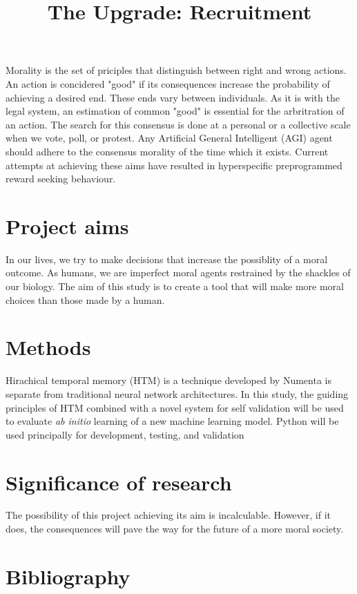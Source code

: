 \documentclass[12pt]{article}
\title{The Upgrade: Recruitment}
\date{\vspace{-5ex}}
\author{\vspace{-5ex}}
\begin{document}
\maketitle

Morality is the set of priciples that distinguish between right and wrong actions. An action is concidered "good" if its consequences increase the probability of achieving a desired end. These ends vary between individuals. As it is with the legal system, an estimation of common "good" is essential for the arbritration of an action. The search for this consensus is done at a personal or a collective scale when we vote, poll, or protest.  Any Artificial General Intelligent (AGI) agent should adhere to the consensus morality of the time which it exists. Current attempts at achieving these aims have resulted in hyperspecific preprogrammed reward seeking behaviour.

\section*{Project aims}
In our lives, we try to make decisions that increase the possiblity of a moral outcome. As humans, we are imperfect moral agents restrained by the shackles of our biology. The aim of this study is to create a tool that will make more moral choices than those made by a human. 

\section*{Methods}
Hirachical temporal memory (HTM) is a technique developed by Numenta \cite{numentahome} is separate from traditional neural network architectures.  In this study, the guiding principles of HTM combined with a novel system for self validation will be used to evaluate \emph{ab initio} learning of a new machine learning model. Python will be used principally for development, testing, and validation

\section*{Significance of research}
The possibility of this project achieving its aim is incalculable. However, if it does, the consequences will pave the way for the future of a more moral society.

\section*{Bibliography}

\end{document}
